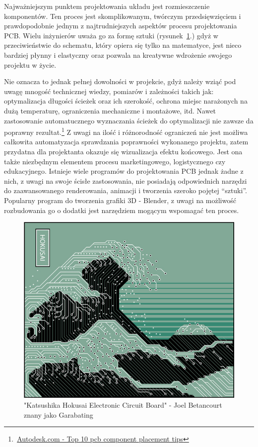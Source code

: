 \documentclass{xmgr}
\begin{document}
    Najważniejszym punktem projektowania układu jest rozmieszczenie komponentów. Ten proces jest skomplikowanym, twórczym przedsięwzięciem i prawdopodobnie jednym z najtrudniejszych aspektów procesu projektowania PCB. Wielu inżynierów uważa go za formę sztuki (rysunek~\ref{RYS.1}.) gdyż w przeciwieństwie do schematu, który opiera się tylko na matematyce, jest nieco bardziej płynny i elastyczny oraz pozwala na kreatywne wdrożenie swojego projektu w życie.

Nie oznacza to jednak pełnej dowolności w projekcie, gdyż należy wziąć pod uwagę mnogość technicznej wiedzy, pomiarów i zależności takich jak: optymalizacja długości ścieżek oraz ich szerokość, ochrona miejsc narażonych na dużą temperaturę, ograniczenia mechaniczne i montażowe, itd. Nawet zastosowanie automatucznego wyznaczania ścieżek do optymalizacji nie zawsze da poprawny rezultat.\footnote{\,\href{https://www.autodesk.com/products/eagle/blog/top-10-pcb-component-placement-tips-pcb-beginner/}{Autodesk.com - Top 10 pcb component placement tips}} Z uwagi na ilość i różnorodność ograniczeń nie jest możliwa całkowita automatyzacja sprawdzania poprawności wykonanego projektu, zatem przydatna dla projektanta okazuje się wizualizacja efektu końcowego. Jest ona także niezbędnym elementem procesu marketingowego, logistycznego czy edukacyjnego. Istnieje wiele programów do projektowania PCB jednak żadne z nich, z uwagi na swoje ścisłe zastosowania, nie posiadają odpowiednich narzędzi do zaawansowanego renderowania, animacji i tworzenia szeroko pojętej “sztuki”. Popularny program do tworzenia grafiki 3D - Blender, z uwagi na możliwość rozbudowania go o dodatki jest narzędziem mogącym wspomagać ten proces.

\begin{figure}[!tbh]
\centering
\includegraphics[width=0.82\hsize]{fig/hokusai}
\caption{"Katsushika Hokusai Electronic Circuit Board" - Joel Betancourt znany jako Garabating\label{RYS.1}}
\end{figure}
\end{document}
